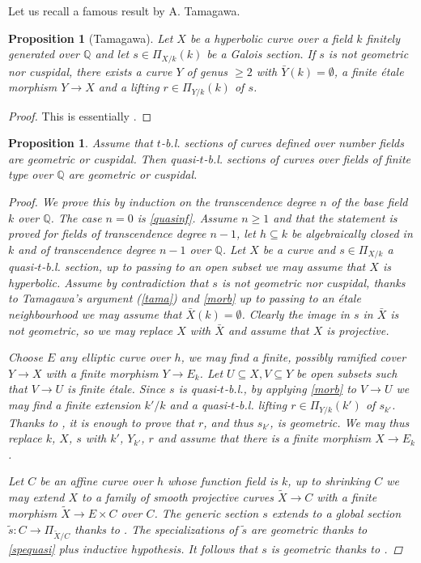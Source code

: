 \documentclass[11pt]{amsart}
\theoremstyle{plain}
\newtheorem{proposition}[theorem]{Proposition}
\theoremstyle{definition}
\newcommand{\1}{\mathbb{1}}
\newcommand{\Q}{\mathbb{Q}}
\newcommand{\s}{\subseteq}
\renewcommand{\tilde}{\widetilde}
\begin{document}
Let us recall a famous result by A. Tamagawa.

\begin{proposition}[Tamagawa]\label{tama}
    Let $X$ be a hyperbolic curve over a field $k$ finitely generated over $\Q$ and let $s\in\Pi_{X/k}(k)$ be a Galois section. If $s$ is not geometric nor cuspidal, there exists a curve $Y$ of genus $\ge 2$ with $\bar{Y}(k)=\emptyset$, a finite étale morphism $Y\to X$ and a lifting $r\in\Pi_{Y/k}(k)$ of $s$.
\end{proposition}

\begin{proof}
    This is essentially \cite[Proposition 2.8 (iv)]{tam97}.
\end{proof}

\begin{proposition}\label{nffg}
	Assume that $t$-b.l. sections of curves defined over number fields are geometric or cuspidal. Then quasi-$t$-b.l. sections of curves over fields of finite type over $\Q$ are geometric or cuspidal.
	\begin{proof}
		We prove this by induction on the transcendence degree $n$ of the base field $k$ over $\Q$. The case $n=0$ is \autoref{quasinf}. Assume $n \ge 1$ and that the statement is proved for fields of transcendence degree $n-1$, let $h\s k$ be algebraically closed in $k$ and of transcendence degree $n-1$ over $\Q$. Let $X$ be a curve and $s\in\Pi_{X/k}$ a quasi-$t$-b.l. section, up to passing to an open subset we may assume that $X$ is hyperbolic. Assume by contradiction that $s$ is not geometric nor cuspidal, thanks to Tamagawa's argument (\autoref{tama}) and \autoref{morb} up to passing to an étale neighbourhood we may assume that $\bar{X}(k)=\emptyset$. Clearly the image in $s$ in $\bar{X}$ is not geometric, so we may replace $X$ with $\bar{X}$ and assume that $X$ is projective.
		
		Choose $E$ any elliptic curve over $h$, we may find a finite, possibly ramified cover $Y\to X$ with a finite morphism $Y\to E_{k}$. Let $U\s X,V\s Y$ be open subsets such that $V\to U$ is finite étale. Since $s$ is quasi-$t$-b.l., by applying \autoref{morb} to $V\to U$ we may find a finite extension $k'/k$ and a quasi-$t$-b.l. lifting $r\in\Pi_{Y/k}(k')$ of $s_{k'}$. Thanks to \cite[Lemma 6.5, Theorem 7.2]{anab}, it is enough to prove that $r$, and thus $s_{k'}$, is geometric. We may thus replace $k$, $X$, $s$ with $k'$, $Y_{k'}$, $r$ and assume that there is a finite morphism $X\to E_{k}$.
		
		Let $C$ be an affine curve over $h$ whose function field is $k$, up to shrinking $C$ we may extend $X$ to a family of smooth projective curves $\tilde{X}\to C$ with a finite morphism $\tilde{X}\to E\times C$ over $C$. The generic section $s$ extends to a global section $\tilde{s}:C\to\Pi_{\tilde{X}/C}$ thanks to \cite[Corollary 3.4]{scfg}. The specializations of $\tilde{s}$ are geometric thanks to \autoref{spequasi} plus inductive hypothesis. It follows that $s$ is geometric thanks to \cite[Definition 4.1, Corollary 4.9]{scfg}.
	\end{proof}
\end{proposition}
\end{document}
